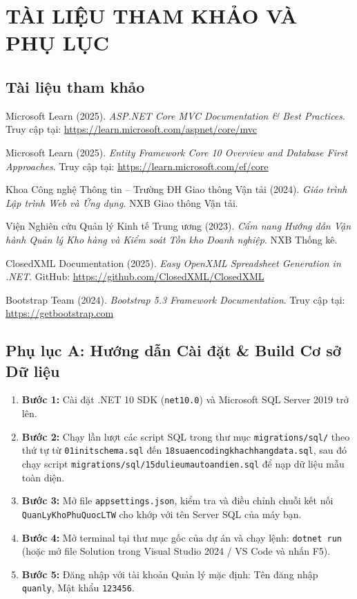 \documentclass[12pt,a4paper]{report}
\renewcommand{\_}{\textunderscore\allowbreak}
\begin{document}
\chapter*{TÀI LIỆU THAM KHẢO VÀ PHỤ LỤC}

\section*{Tài liệu tham khảo}
\begin{enumerate}[label={[\arabic*]}]
    \item Microsoft Learn (2025). \textit{ASP.NET Core MVC Documentation \& Best Practices}. Truy cập tại: \url{https://learn.microsoft.com/aspnet/core/mvc}
    \item Microsoft Learn (2025). \textit{Entity Framework Core 10 Overview and Database First Approaches}. Truy cập tại: \url{https://learn.microsoft.com/ef/core}
    \item Khoa Công nghệ Thông tin -- Trường ĐH Giao thông Vận tải (2024). \textit{Giáo trình Lập trình Web và Ứng dụng}. NXB Giao thông Vận tải.
    \item Viện Nghiên cứu Quản lý Kinh tế Trung ương (2023). \textit{Cẩm nang Hướng dẫn Vận hành Quản lý Kho hàng và Kiểm soát Tồn kho Doanh nghiệp}. NXB Thống kê.
    \item ClosedXML Documentation (2025). \textit{Easy OpenXML Spreadsheet Generation in .NET}. GitHub: \url{https://github.com/ClosedXML/ClosedXML}
    \item Bootstrap Team (2024). \textit{Bootstrap 5.3 Framework Documentation}. Truy cập tại: \url{https://getbootstrap.com}
\end{enumerate}

\section*{Phụ lục A: Hướng dẫn Cài đặt \& Build Cơ sở Dữ liệu}
\begin{enumerate}
    \item \textbf{Bước 1:} Cài đặt .NET 10 SDK (\texttt{net10.0}) và Microsoft SQL Server 2019 trở lên.
    \item \textbf{Bước 2:} Chạy lần lượt các script SQL trong thư mục \texttt{migrations/sql/} theo thứ tự từ \texttt{01\_init\_schema.sql} đến \texttt{18\_sua\_encoding\_khach\_hang\_data.sql}, sau đó chạy script \texttt{migrations/sql/15\_du\_lieu\_mau\_toan\_dien.sql} để nạp dữ liệu mẫu toàn diện.
    \item \textbf{Bước 3:} Mở file \texttt{appsettings.json}, kiểm tra và điều chỉnh chuỗi kết nối \texttt{QuanLyKhoPhuQuocLTW} cho khớp với tên Server SQL của máy bạn.
    \item \textbf{Bước 4:} Mở terminal tại thư mục gốc của dự án và chạy lệnh: \texttt{dotnet run} (hoặc mở file Solution trong Visual Studio 2024 / VS Code và nhấn F5).
    \item \textbf{Bước 5:} Đăng nhập với tài khoản Quản lý mặc định: Tên đăng nhập \texttt{quanly}, Mật khẩu \texttt{123456}.
\end{enumerate}
\end{document}
